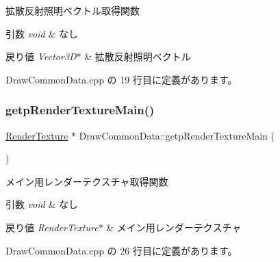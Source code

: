 拡散反射照明ベクトル取得関数 


\begin{DoxyParams}{引数}
{\em void} & なし \\
\hline
\end{DoxyParams}

\begin{DoxyRetVals}{戻り値}
{\em Vector3\+D$\ast$} & 拡散反射照明ベクトル \\
\hline
\end{DoxyRetVals}


 Draw\+Common\+Data.\+cpp の 19 行目に定義があります。

\mbox{\label{class_draw_common_data_ac61796a143057a2d0ab729be59287e7c}} 
\subsubsection{\texorpdfstring{getp\+Render\+Texture\+Main()}{getpRenderTextureMain()}}
{\footnotesize\ttfamily \mbox{\hyperlink{class_render_texture}{Render\+Texture}} $\ast$ Draw\+Common\+Data\+::getp\+Render\+Texture\+Main (\begin{DoxyParamCaption}{ }\end{DoxyParamCaption})}



メイン用レンダーテクスチャ取得関数 


\begin{DoxyParams}{引数}
{\em void} & なし \\
\hline
\end{DoxyParams}

\begin{DoxyRetVals}{戻り値}
{\em Render\+Texture$\ast$} & メイン用レンダーテクスチャ \\
\hline
\end{DoxyRetVals}


 Draw\+Common\+Data.\+cpp の 26 行目に定義があります。

\mbox{\label{class_draw_common_data_a2b356433718b5027d3f50d8860a9d6ff}} 

